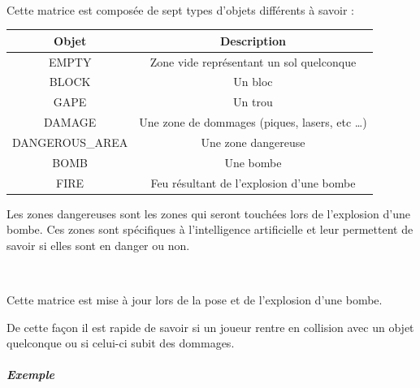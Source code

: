 			$\,$
			
			Cette matrice est composée de sept types d'objets différents à savoir :
			
			\begin{center}
				\begin{tabular}{|c|c|} \hline
				Objet  & Description \\\hline
				EMPTY  & Zone vide représentant un sol quelconque\\\hline
				BLOCK  & Un bloc \\\hline
				GAPE   & Un trou \\\hline
				DAMAGE & Une zone de dommages (piques, lasers, etc \ldots) \\\hline
				DANGEROUS\_AREA & Une zone dangereuse\\\hline
				BOMB & Une bombe\\\hline
				FIRE & Feu résultant de l'explosion d'une bombe\\\hline
				\end{tabular}
			\end{center}
			
			Les zones dangereuses sont les zones qui seront touchées lors de l'explosion
			d'une bombe. Ces zones sont spécifiques à l'intelligence artificielle et leur
			permettent de savoir si elles sont en danger ou non.
			
			
			$\,$
			
			Cette matrice est mise à jour lors de la pose et de l'explosion d'une bombe.
			
			De cette façon il est rapide de savoir si un joueur rentre en collision avec
			un objet quelconque ou si celui-ci subit des dommages.
			
			\subparagraph{Exemple}
			
